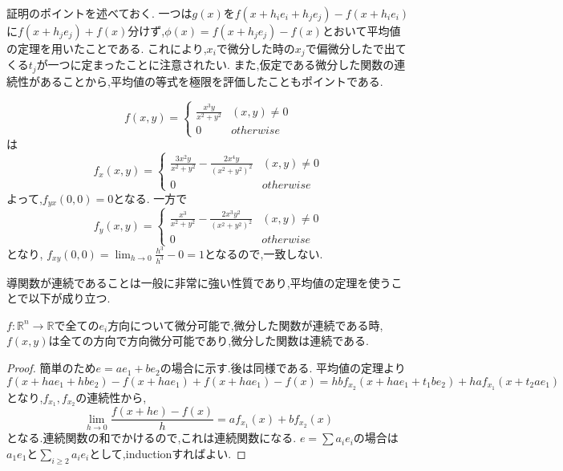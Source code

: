 \begin{rem}
証明のポイントを述べておく.
一つは$g(x)$を$f(x+h_ie_i+h_je_j)- f(x+h_ie_i)$に$f(x+h_je_j) + f(x)$分けず,$\phi(x) = f(x +h_je_j) - f(x)$とおいて平均値の定理を用いたことである.
これにより,$x_i$で微分した時の$x_j$で偏微分したで出てくる$t_j$が一つに定まったことに注意されたい.
また,仮定である微分した関数の連続性があることから,平均値の等式を極限を評価したこともポイントである.
\end{rem}

\begin{epl}
\begin{equation*}
    f(x, y) = \begin{cases}
     \frac{x^3y}{x^2 + y^2}  & (x,y) \neq 0 \\
     0 & otherwise
   \end{cases}
\end{equation*}
は
\begin{equation*}
    f_x(x, y) = \begin{cases}
     \frac{3x^2y}{x^2 + y^2} - \frac{2x^4y}{(x^2 + y^2)^2}  & (x,y) \neq 0 \\
     0 & otherwise
   \end{cases}
\end{equation*}
よって,$f_{yx}(0, 0) = 0$となる.
一方で
\begin{equation*}
    f_y(x, y) = \begin{cases}
     \frac{x^3}{x^2 + y^2} - \frac{2x^3y^2}{(x^2 + y^2)^2}  & (x,y) \neq 0 \\
     0 & otherwise
   \end{cases}
\end{equation*}
となり,
$f_{xy}(0, 0) = \lim_{h \to 0} \frac{h^3}{h^3} - 0 = 1$となるので,一致しない.
\end{epl}

導関数が連続であることは一般に非常に強い性質であり,平均値の定理を使うことで以下が成り立つ.


\begin{prop}
$f:\mathbb{R}^n \to \mathbb{R}$で全ての$e_i$方向について微分可能で,微分した関数が連続である時,$f(x,y)$は全ての方向で方向微分可能であり,微分した関数は連続である.
\end{prop}
\begin{proof}
簡単のため$e = ae_1 + be_2$の場合に示す.後は同様である.
平均値の定理より
\begin{equation*}
f(x+ hae_1 + hbe_2) - f(x + hae_1) + f(x+hae_1) - f(x) = hbf_{x_2}(x + hae_1 + t_1be_2) + haf_{x_1}(x+t_2ae_1)
\end{equation*}
となり,$f_{x_1}, f_{x_2}$の連続性から,
\begin{equation*}
\lim_{h \to 0} \frac{f(x+he) - f(x)}{h} = af_{x_1}(x) + bf_{x_2}(x)
\end{equation*}
となる.連続関数の和でかけるので,これは連続関数になる.
$e = \sum a_i e_i$の場合は$a_1e_1$と$\sum_{i \ge 2} a_i e_i$として,inductionすればよい.
\end{proof}

